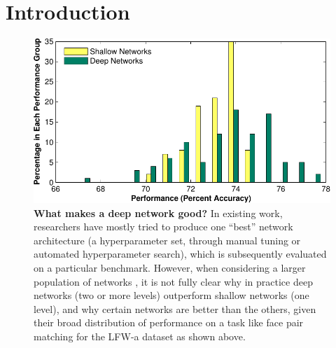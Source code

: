 \documentclass[10pt,twocolumn,letterpaper]{article}
\begin{document}
\section{Introduction}

\begin{figure}
\begin{center}
\includegraphics[width=0.85\columnwidth]{Figs/e_fig7s_compact-crop.pdf} 
\end{center}
\caption{{\bf What makes a deep network good?}
In existing work, researchers have mostly tried to produce one ``best'' network architecture (\ie a hyperparameter set, through manual tuning or automated hyperparameter search), which is subsequently evaluated on a particular benchmark. However, when considering a larger population of networks \cite{cox2011beyond}, it is not fully clear why in practice deep networks (\eg two or more levels) outperform shallow networks (\eg one level), and why certain networks are better than the others, given their broad distribution of performance on a task like face pair matching for the LFW-a dataset \cite{LFWTech, wolf2011effective} as shown above.
} %
\label{fig:perf}
\end{figure}
\end{document}
